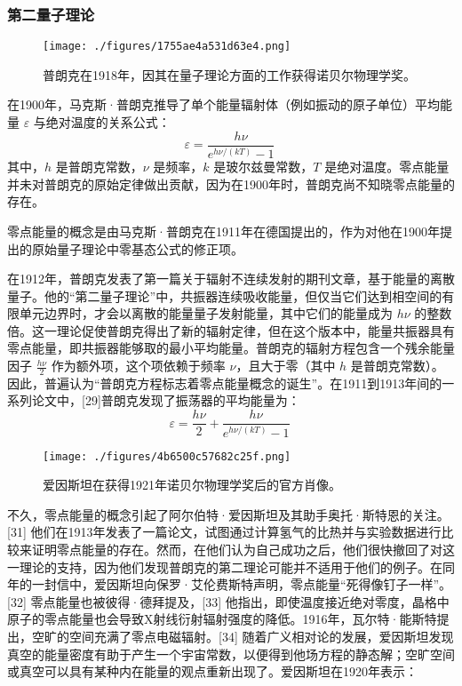 \subsubsection{第二量子理论}
\begin{figure}[ht]
\centering
\texttt{[image: ./figures/1755ae4a531d63e4.png]}
\caption{普朗克在1918年，因其在量子理论方面的工作获得诺贝尔物理学奖。} \label{fig_LD_6}
\end{figure}
在1900年，马克斯·普朗克推导了单个能量辐射体（例如振动的原子单位）平均能量 \(\varepsilon\) 与绝对温度的关系公式：
\[
\varepsilon = \frac{h\nu}{e^{h\nu / (kT)} - 1}~
\]
其中，\(h\) 是普朗克常数，\(\nu\) 是频率，\(k\) 是玻尔兹曼常数，\(T\) 是绝对温度。零点能量并未对普朗克的原始定律做出贡献，因为在1900年时，普朗克尚不知晓零点能量的存在。

零点能量的概念是由马克斯·普朗克在1911年在德国提出的，作为对他在1900年提出的原始量子理论中零基态公式的修正项。

在1912年，普朗克发表了第一篇关于辐射不连续发射的期刊文章，基于能量的离散量子。他的“第二量子理论”中，共振器连续吸收能量，但仅当它们达到相空间的有限单元边界时，才会以离散的能量量子发射能量，其中它们的能量成为 \(h\nu\) 的整数倍。这一理论促使普朗克得出了新的辐射定律，但在这个版本中，能量共振器具有零点能量，即共振器能够取的最小平均能量。普朗克的辐射方程包含一个残余能量因子 \(\frac{h\nu}{2}\) 作为额外项，这个项依赖于频率 \(\nu\)，且大于零（其中 \(h\) 是普朗克常数）。因此，普遍认为“普朗克方程标志着零点能量概念的诞生”。在1911到1913年间的一系列论文中，[29]普朗克发现了振荡器的平均能量为：
\[
\varepsilon = \frac{h\nu}{2} + \frac{h\nu}{e^{h\nu / (kT)} - 1}~
\]
\begin{figure}[ht]
\centering
\texttt{[image: ./figures/4b6500c57682c25f.png]}
\caption{爱因斯坦在获得1921年诺贝尔物理学奖后的官方肖像。} \label{fig_LD_5}
\end{figure}
不久，零点能量的概念引起了阿尔伯特·爱因斯坦及其助手奥托·斯特恩的关注。[31] 他们在1913年发表了一篇论文，试图通过计算氢气的比热并与实验数据进行比较来证明零点能量的存在。然而，在他们认为自己成功之后，他们很快撤回了对这一理论的支持，因为他们发现普朗克的第二理论可能并不适用于他们的例子。在同年的一封信中，爱因斯坦向保罗·艾伦费斯特声明，零点能量“死得像钉子一样”。[32] 零点能量也被彼得·德拜提及，[33] 他指出，即使温度接近绝对零度，晶格中原子的零点能量也会导致X射线衍射辐射强度的降低。1916年，瓦尔特·能斯特提出，空旷的空间充满了零点电磁辐射。[34] 随着广义相对论的发展，爱因斯坦发现真空的能量密度有助于产生一个宇宙常数，以便得到他场方程的静态解；空旷空间或真空可以具有某种内在能量的观点重新出现了。爱因斯坦在1920年表示：

